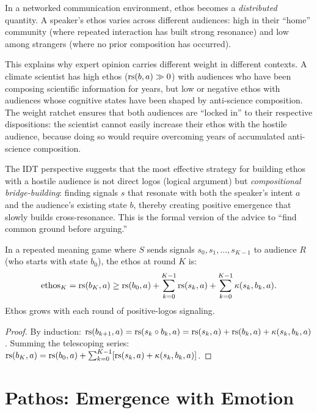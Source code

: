 \begin{remark}
\label{rem:ethos-network}
In a networked communication environment, ethos becomes a \emph{distributed}
quantity.  A speaker's ethos varies across different audiences: high in their
``home'' community (where repeated interaction has built strong resonance)
and low among strangers (where no prior composition has occurred).

This explains why expert opinion carries different weight in different
contexts.  A climate scientist has high ethos ($\mathrm{rs}(b, a) \gg 0$) with
audiences who have been composing scientific information for years, but
low or negative ethos with audiences whose cognitive states have been
shaped by anti-science composition.  The weight ratchet ensures that
both audiences are ``locked in'' to their respective dispositions:
the scientist cannot easily increase their ethos with the hostile audience,
because doing so would require overcoming years of accumulated
anti-science composition.

The IDT perspective suggests that the most effective strategy for building
ethos with a hostile audience is not direct logos (logical argument) but
\emph{compositional bridge-building}: finding signals $s$ that resonate
with both the speaker's intent $a$ and the audience's existing state $b$,
thereby creating positive emergence that slowly builds cross-resonance.
This is the formal version of the advice to ``find common ground before
arguing.''
\end{remark}

\begin{theorem}
\label{thm:ethos-accumulation}
In a repeated meaning game where $S$ sends signals $s_0, s_1, \ldots, s_{K-1}$
to audience $R$ (who starts with state $b_0$), the ethos at round $K$ is:
\[
  \text{ethos}_K = \mathrm{rs}(b_K, a) \geq \mathrm{rs}(b_0, a) + \sum_{k=0}^{K-1}
  \mathrm{rs}(s_k, a) + \sum_{k=0}^{K-1} \kappa(s_k, b_k, a).
\]
Ethos grows with each round of positive-logos signaling.
\end{theorem}

\begin{proof}
By induction: $\mathrm{rs}(b_{k+1}, a) = \mathrm{rs}(s_k \circ b_k, a) = \mathrm{rs}(s_k, a) +
\mathrm{rs}(b_k, a) + \kappa(s_k, b_k, a)$.  Summing the telescoping series:
$\mathrm{rs}(b_K, a) = \mathrm{rs}(b_0, a) + \sum_{k=0}^{K-1} [\mathrm{rs}(s_k, a) + \kappa(s_k, b_k, a)]$.
\end{proof}


\section{Pathos: Emergence with Emotion}

